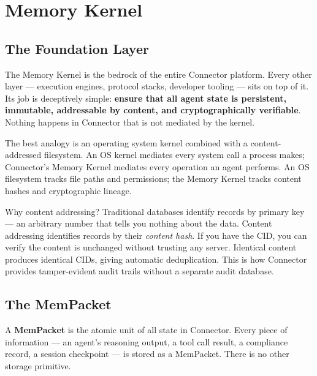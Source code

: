 \chapter{Memory Kernel}

\section{The Foundation Layer}

The Memory Kernel is the bedrock of the entire Connector platform. Every other
layer — execution engines, protocol stacks, developer tooling — sits on top of
it. Its job is deceptively simple: \textbf{ensure that all agent state is
persistent, immutable, addressable by content, and cryptographically
verifiable}. Nothing happens in Connector that is not mediated by the kernel.

The best analogy is an operating system kernel combined with a content-addressed
filesystem. An OS kernel mediates every system call a process makes; Connector's
Memory Kernel mediates every operation an agent performs. An OS filesystem
tracks file paths and permissions; the Memory Kernel tracks content hashes and
cryptographic lineage.

\begin{insightbox}{Why content addressing?}
Traditional databases identify records by primary key — an arbitrary number that
tells you nothing about the data. Content addressing identifies records by their
\emph{content hash}. If you have the CID, you can verify the content is
unchanged without trusting any server. Identical content produces identical CIDs,
giving automatic deduplication. This is how Connector provides tamper-evident
audit trails without a separate audit database.
\end{insightbox}

\section{The MemPacket}

A \textbf{MemPacket} is the atomic unit of all state in Connector. Every piece
of information — an agent's reasoning output, a tool call result, a compliance
record, a session checkpoint — is stored as a MemPacket. There is no other
storage primitive.

